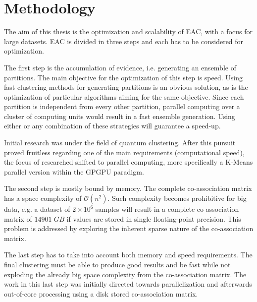 
\chapter{Methodology}
\label{chapter:methodology}




The aim of this thesis is the optimization and scalability of EAC, with a focus for large datasets.
EAC is divided in three steps and each has to be considered for optimization.

The first step is the accumulation of evidence, i.e. generating an ensemble of partitions.
The main objective for the optimization of this step is speed.
Using fast clustering methods for generating partitions is an obvious solution, as is the optimization of particular algorithms aiming for the same objective.
Since each partition is independent from every other partition, parallel computing over a cluster of computing units would result in a fast ensemble generation.
Using either or any combination of these strategies will guarantee a speed-up.

Initial research was under the field of quantum clustering.
After this pursuit proved fruitless regarding one of the main requirements (computational speed), the focus of researched shifted to parallel computing, more specifically a K-Means parallel version within the GPGPU paradigm.
	
The second step is mostly bound by memory.
The complete co-association matrix has a space complexity of $\mathcal{O}(n^2)$.
Such complexity becomes prohibitive for big data, e.g. a dataset of $2 \times 10^6$ samples will result in a complete co-association matrix of $14901 \; GB$ if values are stored in single floating-point precision.
This problem is addressed by exploring the inherent sparse nature of the co-association matrix.

The last step has to take into account both memory and speed requirements.
The final clustering must be able to produce good results and be fast while not exploding the already big space complexity from the co-association matrix.
The work in this last step was initially directed towards parallelization and afterwards out-of-core processing using a disk stored co-association matrix.%

